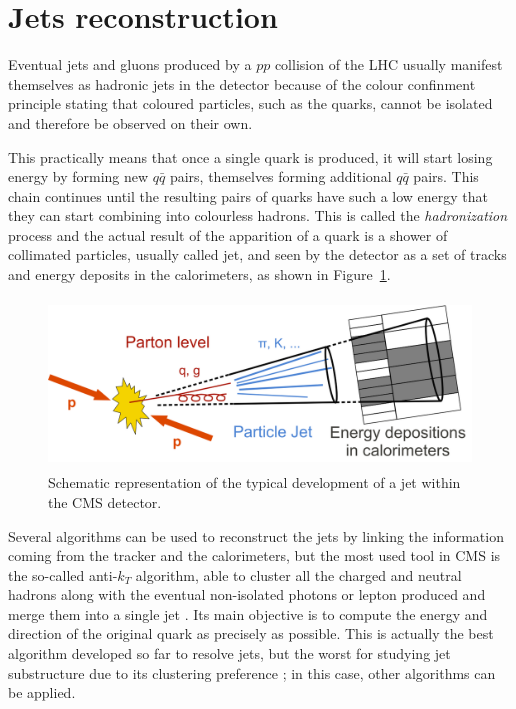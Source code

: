 \documentclass[a4paper, 10pt, openright]{report}
\begin{document}
\section{Jets reconstruction} \label{section:RecoJet}

Eventual jets and gluons produced by a $pp$ collision of the \ac{LHC} usually manifest themselves as hadronic jets in the detector because of the colour confinment principle stating that coloured particles, such as the quarks, cannot be isolated and therefore be observed on their own. 

This practically means that once a single quark is produced, it will start losing energy by forming new $q \bar q$ pairs, themselves forming additional $q \bar q$ pairs. This chain continues until the resulting pairs of quarks have such a low energy that they can start combining into colourless hadrons. This is called the \textit{hadronization} process and the actual result of the apparition of a quark is a shower of collimated particles, usually called jet, and seen by the detector as a set of tracks and energy deposits in the calorimeters, as shown in Figure~\ref{fig:CMSJets}. %

\begin{figure}[htbp]
\begin{center}
\includegraphics[width=12cm, height=4.5cm]{figs/CMSJets.png}
\caption{Schematic representation of the typical development of a jet within the \ac{CMS} detector.}
\label{fig:CMSJets}
\end{center}
\end{figure}

Several algorithms can be used to reconstruct the jets by linking the information coming from the tracker and the calorimeters, but the most used tool in \ac{CMS} is the so-called anti-$k_T$ algorithm, able to cluster all the charged and neutral hadrons along with the eventual non-isolated photons or lepton produced and merge them into a single jet \cite{JetReco}. Its main objective is to compute the energy and direction of the original quark as precisely as possible. This is actually the best algorithm developed so far to resolve jets, but the worst for studying jet substructure due to its clustering preference ; in this case, other algorithms can be applied.
\end{document}
